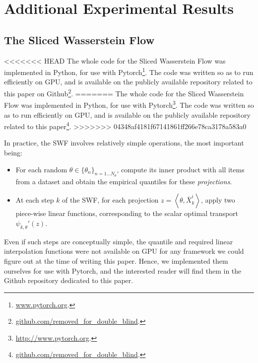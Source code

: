 





\section{Additional Experimental Results}

\subsection{The Sliced Wasserstein Flow}
<<<<<<< HEAD
The whole code for the Sliced Wasserstein Flow was implemented in Python, for use with Pytorch\footnote{\url{www.pytorch.org}.}. The code was written so as to run efficiently on GPU, and is available on the publicly available repository related to this paper on Github\footnote{\url{github.com/removed_for_double_blind}.}.
=======
The whole code for the Sliced Wasserstein Flow was implemented in Python, for use with Pytorch\footnote{\url{http://www.pytorch.org}.}. The code was written so as to run efficiently on GPU, and is available on the publicly available repository related to this paper\footnote{\url{github.com/removed_for_double_blind}.}.
>>>>>>> 04348af4181f67141861ff266e78ca3178a583a0

In practice, the SWF involves relatively simple operations, the most important being:
\begin{itemize}
  \item For each random $\theta\in\{\theta_n\}_{n=1\dots N_\theta}$,  compute its inner product with all items from a dataset and obtain the empirical quantiles for these \emph{projections}.
  \item At each step $k$ of the SWF, for each projection $z=\left<\theta, \bar{X}^i_k\right>$, apply two piece-wise linear functions, corresponding to the scalar optimal transport $\psi_{k, \theta}'(z)$.
\end{itemize}
Even if such steps are conceptually simple, the quantile and required linear interpolation functions were not available on GPU for any framework we could figure out at the time of writing this paper. Hence, we implemented them ourselves for use with Pytorch, and the interested reader will find them in the Github repository dedicated to this paper.


